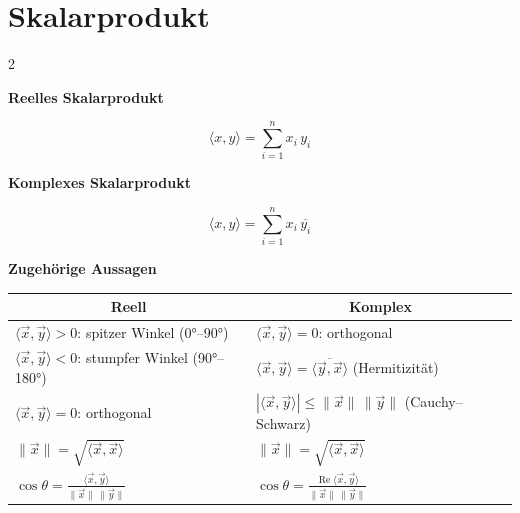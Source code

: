 \documentclass[a4paper,11pt,oneside,open=any,parskip=half, DIV=15]{scrreprt}
\begin{document}
\newpage
\section{Skalarprodukt}

   \begin{paracol}{2}

      {\centering \large\textbf{Reelles Skalarprodukt}\par\vspace{0.5ex}}
      \begin{importantbox}
      \[
      \langle x,y\rangle = \sum_{i=1}^{n} x_i\,y_i
      \]
      \end{importantbox}
      \switchcolumn{}
      {\centering \large\textbf{Komplexes Skalarprodukt}\par\vspace{0.5ex}}
      \begin{importantbox}
      \[
      \langle x,y\rangle = \sum_{i=1}^{n} x_i\,\overline{y_i}
      \]
      \end{importantbox}
   \end{paracol}

   \begin{center}
      \textbf{Zugehörige Aussagen}\\[0.4em]
      \begin{tabular}{p{6.8cm} | p{6.8cm}}  %
         \multicolumn{1}{c|}{\textbf{Reell}} & \multicolumn{1}{c}{\textbf{Komplex}}\\ 
         \hline    %
         \(\langle \vec x,\vec y\rangle>0\): spitzer Winkel (0°–90°) &
         \(\langle \vec x,\vec y\rangle=0\): orthogonal \\[0.25em]
         \(\langle \vec x,\vec y\rangle<0\): stumpfer Winkel (90°–180°) &
         \(\langle \vec x,\vec y\rangle=\overline{\langle \vec y,\vec x\rangle}\) (Hermitizität) \\[0.25em]
         \(\langle \vec x,\vec y\rangle=0\): orthogonal &
         \(|\langle \vec x,\vec y\rangle|\le \|\vec x\|\,\|\vec y\|\) (Cauchy–Schwarz) \\[0.25em]
         \(\|\vec x\|=\sqrt{\langle \vec x,\vec x\rangle}\) &
         \(\|\vec x\|=\sqrt{\langle \vec x,\vec x\rangle}\) \\[0.25em]
         \(\displaystyle \cos\theta=\frac{\langle \vec x,\vec y\rangle}{\|\vec x\|\,\|\vec y\|}\) &
         \(\displaystyle \cos\theta=\frac{\operatorname{Re}\langle \vec x,\vec y\rangle}{\|\vec x\|\,\|\vec y\|}\) \\
      \end{tabular}
   \end{center}
\end{document}
